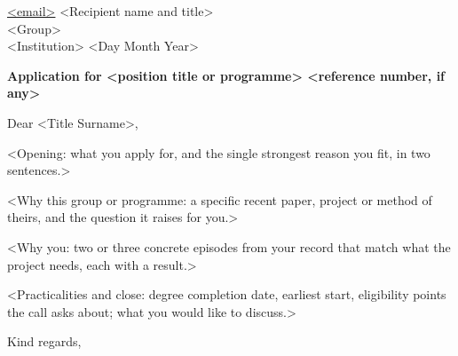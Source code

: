 \documentclass[10pt]{article}
\begin{document}
  {\href{mailto:<email>}{<email>} \enspace\textbullet{}}
  {<Recipient name and title>\\<Group>\\<Institution>}
  {<Day Month Year>}

\textbf{Application for <position title or programme> <reference number, if any>}

Dear <Title Surname>,

<Opening: what you apply for, and the single strongest reason you fit, in two sentences.>

<Why this group or programme: a specific recent paper, project or method of theirs, and the question it raises for you.>

<Why you: two or three concrete episodes from your record that match what the project needs, each with a result.>

<Practicalities and close: degree completion date, earliest start, eligibility points the call asks about; what you would like to discuss.>

Kind regards,

\end{document}
